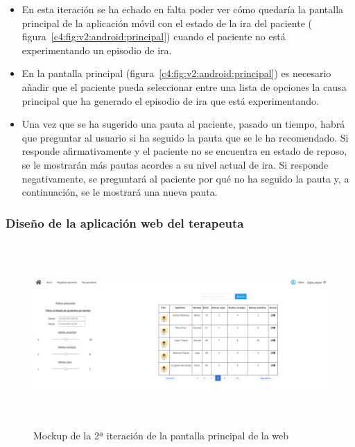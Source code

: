 \begin{itemize}
    \item En esta iteración se ha echado en falta poder ver cómo quedaría la pantalla principal de la aplicación móvil con el estado de la ira del paciente ( figura~\ref{c4:fig:v2:android:principal}) cuando el paciente no está experimentando un episodio de ira.
    \item En la pantalla principal (figura~\ref{c4:fig:v2:android:principal}) es necesario añadir que el paciente pueda seleccionar entre una lista de opciones la causa principal que ha generado el episodio de ira que está experimentando.
    \item Una vez que se ha sugerido una pauta al paciente, pasado un tiempo, habrá que preguntar al usuario si ha seguido la pauta que se le ha recomendado. Si responde afirmativamente y el paciente no se encuentra en estado de reposo, se le mostrarán más pautas acordes a su nivel actual de ira. Si responde negativamente, se preguntará al paciente por qué no ha seguido la pauta y, a continuación, se le mostrará una nueva pauta.
\end{itemize}

\subsubsection{Diseño de la aplicación web del terapeuta}

\begin{figure}[H]
    \centering
    \includegraphics[width=0.8\linewidth, height=7cm]{Imagenes/04DescProblema/mockups/v2/web/01-principal.png}
    \caption[Mockup de la 2ª iteración de la pantalla principal de la web]{Mockup de la 2ª iteración de la pantalla principal de la web}
    \label{c4:fig:v2:web:principal}
\end{figure}

